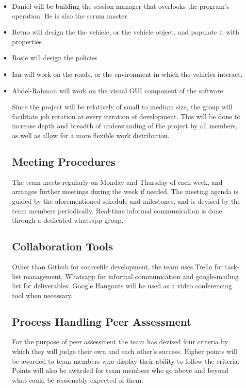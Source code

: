 \documentclass[11pt]{article}
\begin{document}
	\begin{itemize}
		\item Daniel will be building the session manager that overlooks the program’s operation. He is also the scrum master.
		\item Retno will design the the vehicle, or the vehicle object, and populate it with properties
		\item Rosie will design the policies
		\item Ian will work on the roads, or the environment in which the vehicles interact,
		\item Abdel-Rahman will work on the visual GUI component of the software

Since the project will be relatively of small to medium size, the group will facilitate job rotation at every iteration of development. This will be done to increase depth and breadth of understanding of the project by all members, as well as allow for a more flexible work distribution. 
\subsection{Meeting Procedures}

The team meets regularly on Monday and Thursday of each week, and arranges further meetings during the week if needed. The meeting agenda is guided by the aforementioned schedule and milestones, and is devised by the team members periodically. Real-time informal communication is done through a dedicated whatsapp group.

\subsection{Collaboration Tools}

Other than Github for sourcefile development, the team uses Trello for task-list management, Whatsapp for informal communication and google-mailing list for deliverables. Google Hangouts will be used as a video conferencing tool when necessary. 


\subsection{Process Handling Peer Assessment}
For the purpose of peer assessment the team has devised four criteria by which they will judge their own
and each other's success. Higher points will be awarded to team members who display their ability to follow the criteria. Points will also be awarded for team members who go above and beyond what could be reasonably expected of them.


\end{itemize}
\end{document}
